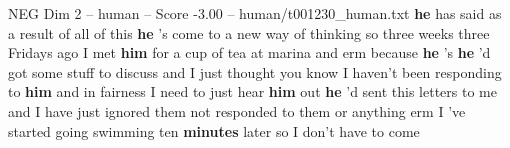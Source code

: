 \begin{textsample}{NEG Dim 2 – human – Score -3.00 – human/t001230\_human.txt}  \label{ex:f2_neg_002}
\textbf{he} has said as a result of all of this \textbf{he} 's come to a new way of thinking so three weeks three Fridays ago I met \textbf{him} for a cup of tea at marina and erm because \textbf{he} 's \textbf{he} 'd got some stuff to discuss and I just thought you know I haven't been responding to \textbf{him} and in fairness I need to just hear \textbf{him} out \textbf{he} 'd sent this letters to me and I have just ignored them not responded to them or anything erm I 've started going swimming ten \textbf{minutes} later so I don't have to come

\end{textsample}
